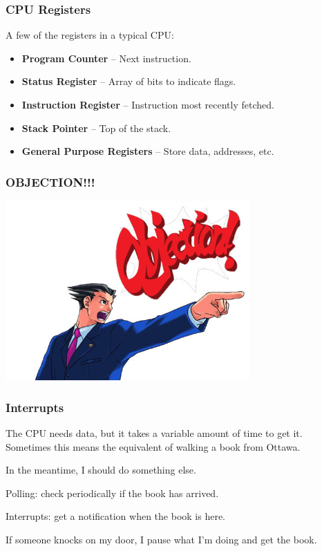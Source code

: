 \begin{frame}
\frametitle{CPU Registers}

A few of the registers in a typical CPU:

\begin{itemize}
	\item \textbf{Program Counter} -- Next instruction.
	\item \textbf{Status Register} -- Array of bits to indicate flags.
	\item \textbf{Instruction Register} -- Instruction most recently fetched.
	\item \textbf{Stack Pointer} -- Top of the stack.
	\item \textbf{General Purpose Registers} -- Store data, addresses, etc.
\end{itemize}


\end{frame}


\begin{frame}
\frametitle{OBJECTION!!!}

\begin{center}
\includegraphics[width=0.7\textwidth]{images/phoenix-wright-objection.jpg}
\end{center}


\end{frame}


\begin{frame}
\frametitle{Interrupts}
The CPU needs data, but it takes a variable amount of time to get it.\\
\quad Sometimes this means the equivalent of walking a book from Ottawa.

In the meantime, I should do something else.

Polling: check periodically if the book has arrived.

Interrupts: get a notification when the book is here.

If someone knocks on my door, I pause what I'm doing and get the book.


\end{frame}

